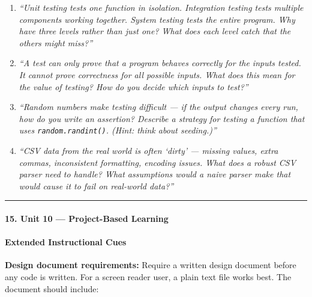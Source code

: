 \documentclass[
  justified,
  openright,
]{tufte-book}
\let\subsection\paragraph
\let\paragraph\paragraph
\let\subsection\paragraph
\let\paragraph\paragraph
\begin{document}
\begin{enumerate}
\def\labelenumi{\arabic{enumi}.}
\item
  \emph{``Unit testing tests one function in isolation. Integration
  testing tests multiple components working together. System testing
  tests the entire program. Why have three levels rather than just one?
  What does each level catch that the others might miss?''}
\item
  \emph{``A test can only prove that a program behaves correctly for the
  inputs tested. It cannot prove correctness for all possible inputs.
  What does this mean for the value of testing? How do you decide which
  inputs to test?''}
\item
  \emph{``Random numbers make testing difficult --- if the output
  changes every run, how do you write an assertion? Describe a strategy
  for testing a function that uses \texttt{random.randint()}. (Hint:
  think about seeding.)''}
\item
  \emph{``CSV data from the real world is often `dirty' --- missing
  values, extra commas, inconsistent formatting, encoding issues. What
  does a robust CSV parser need to handle? What assumptions would a
  naive parser make that would cause it to fail on real-world data?''}
\end{enumerate}

\begin{center}\rule{0.5\linewidth}{0.5pt}\end{center}

\subsection{15. Unit 10 --- Project-Based
Learning}\label{unit-10-project-based-learning}

\subsection{Extended Instructional
Cues}\label{extended-instructional-cues-3}

\textbf{Design document requirements:} Require a written design document
before any code is written. For a screen reader user, a plain text file
works best.
 The document should include:
\end{document}
